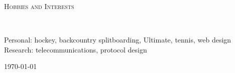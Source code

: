 \documentclass[10pt]{article}
\newenvironment{changemargin}[2]{%
  \begin{list}{}{%
    \setlength{\topsep}{0pt}%
    \setlength{\leftmargin}{#1}%
    \setlength{\rightmargin}{#2}%
    \setlength{\listparindent}{\parindent}%
    \setlength{\itemindent}{\parindent}%
    \setlength{\parsep}{\parskip}%
  }%
  \item[]}{\end{list}
}
\newcommand{\lineover}{
  \begin{changemargin}{-0.05in}{-0.05in}
    \vspace*{-8pt}
    \hrulefill \\
    \vspace*{-2pt}
  \end{changemargin}
}
\renewcommand{\section}[1]{
  \begin{changemargin}{-0.5in}{-0.5in}
    \normalsize \scshape{#1}\\
    \lineover
  \end{changemargin}
}
\newenvironment{body} {
  \vspace{2pt}
  \begin{changemargin}{-0.25in}{-0.5in}
    }{
  \end{changemargin}
}
\begin{document}
\section{Hobbies and Interests}
\begin{body}
Personal: hockey, backcountry splitboarding, Ultimate, tennis, web design \\
Research: telecommunications, protocol design
\end{body}

\vfill \hfill \today
\end{document}
